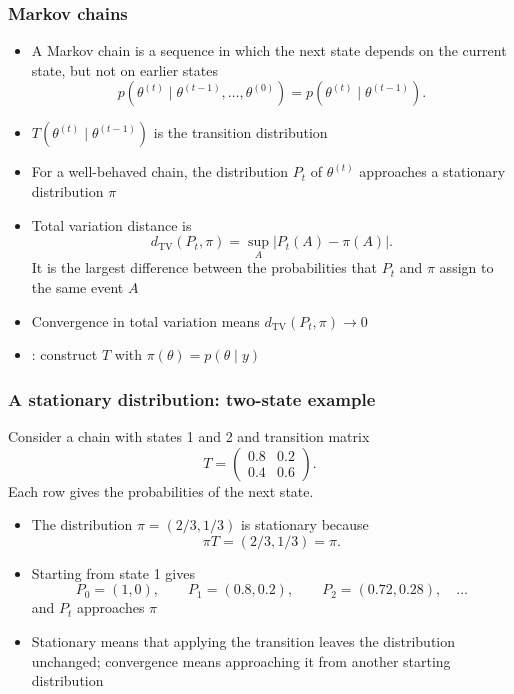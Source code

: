\documentclass[10pt]{beamer}
\begin{document}
\begin{frame}

\frametitle{Markov chains}

  \begin{itemize}
  \item<1-> A Markov chain is a sequence in which the next state depends
    on the current state, but not on earlier states
    \[
    p(\theta^{(t)}\mid\theta^{(t-1)},\ldots,\theta^{(0)})
    =p(\theta^{(t)}\mid\theta^{(t-1)}).
    \]
  \item<2-> $T(\theta^{(t)}\mid\theta^{(t-1)})$ is the
    {\color{uured}transition distribution}
  \item<3-> For a well-behaved chain, the distribution $P_t$ of
    $\theta^{(t)}$ approaches a stationary distribution $\pi$
  \item<4-> Total variation distance is
    \[
      d_{\mathrm{TV}}(P_t,\pi)
      =\sup_A\left|P_t(A)-\pi(A)\right|.
    \]
    It is the largest difference between the probabilities that $P_t$
    and $\pi$ assign to the same event $A$
  \item<5-> Convergence in total variation means
    $d_{\mathrm{TV}}(P_t,\pi)\rightarrow0$
  \item<6-> : construct $T$ with
    $\pi(\theta)=p(\theta\mid y)$
  \end{itemize}

\end{frame}

\begin{frame}

\frametitle{A stationary distribution: two-state example}

  Consider a chain with states 1 and 2 and transition matrix
  \[
    T=
    \begin{pmatrix}
      0.8 & 0.2\\
      0.4 & 0.6
    \end{pmatrix}.
  \]
  Each row gives the probabilities of the next state.
  \pause
  \begin{itemize}
  \item The distribution $\pi=(2/3,1/3)$ is stationary because
    \[
      \pi T=(2/3,1/3)=\pi.
    \]
  \pause
  \item Starting from state 1 gives
    \[
      P_0=(1,0),\qquad P_1=(0.8,0.2),\qquad
      P_2=(0.72,0.28),\quad\ldots
    \]
    and $P_t$ approaches $\pi$
  \item<4-> Stationary means that applying the transition leaves the
    distribution unchanged; convergence means approaching it from another
    starting distribution
  \end{itemize}

\end{frame}
\end{document}
